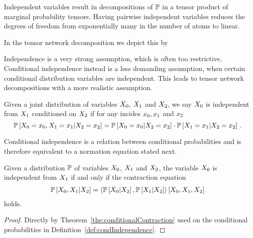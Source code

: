 Independent variables result in decompositions of $\mathbb{P}$ in a tensor product of marginal probability tensors. 
Having pairwise independent variables reduces the degrees of freedom from exponentially many in the number of atoms to linear.

In the tensor network decomposition we depict this by
	\begin{center}
		
	\end{center}

Independence is a very strong assumption, which is often too restrictive.
Conditional independence instead is a less demanding assumption, when certain conditional distribution variables are independent. 
This leads to tensor network decompositions with a more realistic assumption.

\begin{definition}\label{def:condIndependence}
	Given a joint distribution of variables $X_{0}$, $X_{1}$ and $X_{2}$, we say $X_{0}$ is independent from $X_{1}$ conditioned on $X_{2}$ if for any incides $x_{0},x_{1}$ and $x_{2}$
		\[ \mathbb{P}\left[X_{0}=x_{0},X_{1}=x_{1}|X_{2}=x_{2}\right] 
		= \mathbb{P}\left[X_{0}=x_{0}|X_{2}=x_{2}\right] 
		\cdot \mathbb{P}\left[X_{1}=x_{1}|X_{2}=x_{2}\right]   \, . \]
\end{definition}

Conditional independence is a relation between conditional probabilities and is therefore equivalent to a normation equation stated next.

\begin{theorem}\label{the:condIndependenceProductCriterion}
	Given a distribution $\mathbb{P}$ of variables $X_{0}$, $X_{1}$ and $X_{2}$, the variable $X_{0}$ is independent from $X_{1}$ if and only if the contraction equation
	\begin{align*}
		 \mathbb{P}\left[X_{0},X_{1}|X_{2}\right] 
		 = \left\langle 
		 \mathbb{P}\left[X_{0}|X_{2}\right] ,\mathbb{P}\left[X_{1}|X_{2}\right] 
		 \right\rangle \left[ X_{0},X_{1},X_{2} \right]
	\end{align*}
	holds.
\end{theorem}
\begin{proof}
	Directly by Theorem~\ref{the:conditionalContraction} used on the conditional probabilities in Definition~\ref{def:condIndependence}.
\end{proof}

